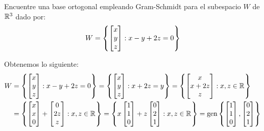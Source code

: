 \begin{exercise}
	Encuentre una base ortogonal empleando Gram-Schmidt para el subespacio $W$ de $\rmath[3]$ dado por:
	\[
		W =
		\set{
			\begin{bmatrix}
				x\\
				y\\
				z
			\end{bmatrix}
		: x - y + 2z = 0
		}
	\]
\end{exercise}
\begin{solution}
	Obtenemos lo siguiente:
	\begin{align*}
		W &=\set{
		\begin{bmatrix}
			x \\ y \\ z
		\end{bmatrix}
		: x - y + 2z = 0	
		}=\set{
		\begin{bmatrix}
			x \\ y \\ z
		\end{bmatrix}
		: x + 2z = y
		}=\set{
		\begin{bmatrix}
			x \\ x + 2z \\ z
		\end{bmatrix}
		: x, z\in\rmath
		}\\
		&=\set{
		\begin{bmatrix}
			x \\ x \\ 0
		\end{bmatrix}
		+
		\begin{bmatrix}
			0 \\ 2z \\ z
		\end{bmatrix}
		: x, z\in\rmath
		}=\set{
		x
		\begin{bmatrix}
			1 \\ 1 \\ 0
		\end{bmatrix}
		+ z
		\begin{bmatrix}
			0 \\ 2 \\ 1
		\end{bmatrix}
		: x, z\in\rmath
		} =\mgen[1]{
		\set{\begin{bmatrix}
			1 \\ 1 \\ 0
		\end{bmatrix},
		\begin{bmatrix}
			0 \\ 2 \\ 1

\end{bmatrix}}}
\end{align*}
\end{solution}
